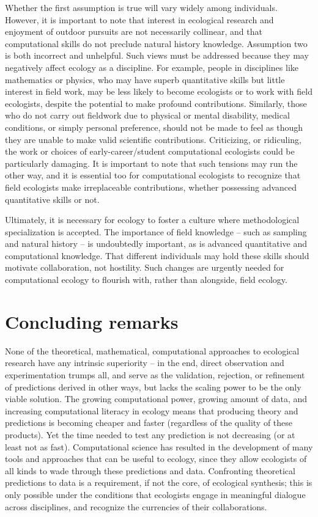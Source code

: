 \documentclass[12pt]{article}
\begin{document}
Whether the first assumption is true will vary widely among individuals.
However, it is important to note that interest in ecological research
and enjoyment of outdoor pursuits are not necessarily collinear, and
that computational skills do not preclude natural history knowledge.
Assumption two is both incorrect and unhelpful. Such views must be
addressed because they may negatively affect ecology as a discipline.
For example, people in disciplines like mathematics or physics, who may
have superb quantitative skills but little interest in field work, may
be less likely to become ecologists or to work with field ecologists,
despite the potential to make profound contributions. Similarly, those
who do not carry out fieldwork due to physical or mental disability,
medical conditions, or simply personal preference, should not be made to
feel as though they are unable to make valid scientific contributions.
Criticizing, or ridiculing, the work or choices of early-career/student
computational ecologists could be particularly damaging. It is important
to note that such tensions may run the other way, and it is essential
too for computational ecologists to recognize that field ecologists make
irreplaceable contributions, whether possessing advanced quantitative
skills or not.

Ultimately, it is necessary for ecology to foster a culture where
methodological specialization is accepted. The importance of field
knowledge -- such as sampling and natural history -- is undoubtedly
important, as is advanced quantitative and computational knowledge. That
different individuals may hold these skills should motivate
collaboration, not hostility. Such changes are urgently needed for
computational ecology to flourish with, rather than alongside, field
ecology.

\hypertarget{concluding-remarks}{%
\section{Concluding remarks}\label{concluding-remarks}}

None of the theoretical, mathematical, computational approaches to
ecological research have any intrinsic superiority -- in the end, direct
observation and experimentation trumps all, and serve as the validation,
rejection, or refinement of predictions derived in other ways, but lacks
the scaling power to be the only viable solution. The growing
computational power, growing amount of data, and increasing
computational literacy in ecology means that producing theory and
predictions is becoming cheaper and faster (regardless of the quality of
these products). Yet the time needed to test any prediction is not
decreasing (or at least not as fast). Computational science has resulted
in the development of many tools and approaches that can be useful to
ecology, since they allow ecologists of all kinds to wade through these
predictions and data. Confronting theoretical predictions to data is a
requirement, if not the core, of ecological synthesis; this is only
possible under the conditions that ecologists engage in meaningful
dialogue across disciplines, and recognize the currencies of their
collaborations.
\end{document}

